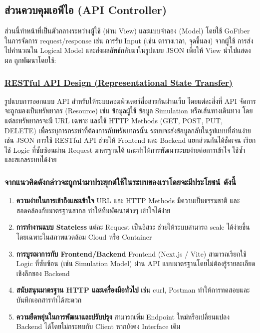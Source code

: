 \subsection{ส่วนควบคุมเอพีไอ (API Controller)}
  ส่วนนี้ทำหน้าที่เป็นตัวกลางระหว่างผู้ใช้ (ผ่าน View) และแบบจำลอง (Model) 
  โดยใช้ GoFiber ในการจัดการ request/response
  เช่น การรับ Input (เช่น ตารางเวลา, จุดขึ้นลง) จากผู้ใช้ 
  การส่งไปคำนวณใน Logical Model และส่งผลลัพธ์กลับมาในรูปแบบ JSON
  เพื่อให้ View นำไปแสดงผล ถูกพัฒนาโดยใช้:

\subsubsection{\textbf{\underline{RESTful API Design (Representational State Transfer)}}}
\begin{mypara}
    \indent รูปแบบการออกแบบ API สำหรับให้ระบบคอมพิวเตอร์สื่อสารกันผ่านเว็บ 
    โดยแต่ละสิ่งที่ API จัดการจะถูกมองเป็นทรัพยากร (Resource) 
    เช่น ข้อมูลผู้ใช้ ข้อมูล Simulation หรือเส้นทางเดินทาง โดยแต่ละทรัพยากรจะมี URL เฉพาะ 
    และใช้ HTTP Methods (GET, POST, PUT, DELETE) เพื่อระบุการกระทำที่ต้องการกับทรัพยากรนั้น 
    ระบบจะส่งข้อมูลกลับในรูปแบบที่อ่านง่าย เช่น JSON การใช้ RESTful API ช่วยให้ Frontend 
    และ Backend แยกส่วนกันได้ชัดเจน เรียกใช้ Logic ที่ซับซ้อนผ่าน Request มาตรฐานได้ 
    และทำให้การพัฒนาระบบง่ายต่อการเข้าใจ ใช้ซ้ำ และสเกลระบบได้ง่าย
\end{mypara}

\subsubsection{\textbf{จากแนวคิดดังกล่าวจะถูกนํามาประยุกต์ใช้ในระบบของเราโดยจะมีประโยชน์ ดังนี้}}
\begin{enumerate}
    \item \textbf{ความง่ายในการเข้าถึงและเข้าใจ}  
    URL และ HTTP Methods มีความเป็นธรรมชาติ และสอดคล้องกับมาตรฐานสากล ทำให้ทีมพัฒนาต่างๆ เข้าใจได้ง่าย
    \item \textbf{การทำงานแบบ Stateless}  
    แต่ละ Request เป็นอิสระ ช่วยให้ระบบสามารถ scale ได้ง่ายขึ้น โดยเฉพาะในสภาพแวดล้อม Cloud หรือ Container
    \item \textbf{การบูรณาการกับ Frontend/Backend}  
    Frontend (Next.js / Vite) สามารถเรียกใช้ Logic ที่ซับซ้อน (เช่น Simulation Model) ผ่าน API แบบมาตรฐานโดยไม่ต้องรู้รายละเอียดเชิงลึกของ Backend
    \item \textbf{สนับสนุนมาตรฐาน HTTP และเครื่องมือทั่วไป}  
    เช่น curl, Postman ทำให้การทดสอบและบันทึกเอกสารทำได้สะดวก
    \item \textbf{ความยืดหยุ่นในการพัฒนาและปรับปรุง}  
    สามารถเพิ่ม Endpoint ใหม่หรือเปลี่ยนแปลง Backend ได้โดยไม่กระทบกับ Client หากยังคง Interface เดิม
\end{enumerate}

